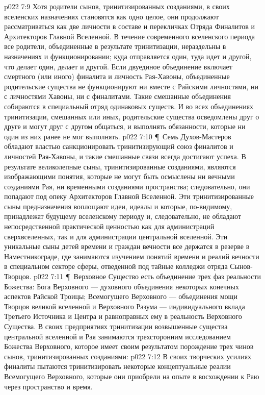 \vs p022 7:9 Хотя родители сынов, тринитизированных созданиями, в своих вселенских назначениях становятся как одно целое, они продолжают рассматриваться как две личности в составе и перекличках Отряда Финалитов и Архитекторов Главной Вселенной. В течение современного вселенского периода все родители, объединенные в результате тринитизации, нераздельны в назначениях и функционировании; куда отправляется один, туда идет и другой, что делает один, делает и другой. Если двуединое объединение включает смертного (или иного) финалита и личность Рая\hyp{}Хавоны, объединенные родительские существа не функционируют ни вместе с Райскими личностями, ни с личностями Хавоны, ни с финалитами. Такие смешанные объединения собираются в специальный отряд одинаковых существ. И во всех объединениях тринитизации, смешанных или иных, родительские существа осведомлены друг о друге и могут друг с другом общаться, и выполнять обязанности, которые ни один из них ранее не мог выполнять.
\vs p022 7:10 \P\ Семь Духов\hyp{}Мастеров обладают властью санкционировать тринитизирующий союз финалитов и личностей Рая\hyp{}Хавоны, и такие смешанные связи всегда достигают успеха. В результате великолепные сыны, тринитизированные созданиями, являются изображающими понятия, которые не могут быть осмыслены ни вечными созданиями Рая, ни временными созданиями пространства; следовательно, они попадают под опеку Архитекторов Главной Вселенной. Эти тринитизированные сыны предназначения воплощают идеи, идеалы и  которые, по\hyp{}видимому, принадлежат будущему вселенскому периоду и, следовательно, не обладают непосредственной практической ценностью как для администраций сверхвселенных, так и для администрации центральной вселенной. Эти уникальные сыны детей времени и граждан вечности все держатся в резерве в Наместникограде, где занимаются изучением понятий времени и реалий вечности в специальном секторе сферы, отведенной под тайные колледжи отряда Сынов\hyp{}Творцов.
\vs p022 7:11 \P\ Верховное Существо есть объединение трех фаз реальности Божества: Бога Верховного --- духовного объединения некоторых конечных аспектов Райской Троицы; Всемогущего Верховного --- объединения мощи Творцов великой вселенной и Верховного Разума --- индивидуального вклада Третьего Источника и Центра и равноправных ему в реальность Верховного Существа. В своих предприятиях тринитизации возвышенные существа центральной вселенной и Рая занимаются трехсторонним исследованием Божества Верховного, которое имеет своим результатом порождение трех чинов сынов, тринитизированных созданиями:
\vs p022 7:12 \bibnobreakspace {} В своих творческих усилиях финалиты пытаются тринитизировать некоторые концептуальные реалии Всемогущего Верховного, которые они приобрели на опыте в восхождении к Раю через пространство и время.
